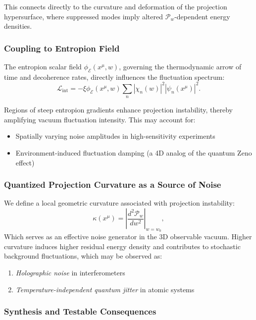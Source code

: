 \documentclass[12pt]{article}
\begin{document}
This connects directly to the curvature and deformation of the projection hypersurface, where suppressed modes imply altered \(\mathcal{P}_w\)-dependent energy densities.

\subsubsection*{Coupling to Entropion Field}

The entropion scalar field \(\phi_{\mathcal{E}}(x^\mu, w)\), governing the thermodynamic arrow of time and decoherence rates, directly influences the fluctuation spectrum:
\begin{equation}
\mathcal{L}_{\text{int}} = - \xi \phi_{\mathcal{E}}(x^\mu, w) \sum_n |\chi_n(w)|^2 |\psi_n(x^\mu)|^2.
\label{eq:entropion_coupling}
\end{equation}

Regions of steep entropion gradients enhance projection instability, thereby amplifying vacuum fluctuation intensity. This may account for:
\begin{itemize}
    \item Spatially varying noise amplitudes in high-sensitivity experiments
    \item Environment-induced fluctuation damping (a 4D analog of the quantum Zeno effect)
\end{itemize}

\subsubsection*{Quantized Projection Curvature as a Source of Noise}

We define a local geometric curvature associated with projection instability:
\begin{equation}
\kappa(x^\mu) = \left| \frac{d^2 \mathcal{P}_w}{dw^2} \right|_{w = w_0},
\end{equation}
Which serves as an effective noise generator in the 3D observable vacuum. Higher curvature induces higher residual energy density and contributes to stochastic background fluctuations, which may be observed as:
\begin{enumerate}
    \item \emph{Holographic noise} in interferometers
    \item \emph{Temperature-independent quantum jitter} in atomic systems
\end{enumerate}

\subsubsection*{Synthesis and Testable Consequences}
\end{document}
